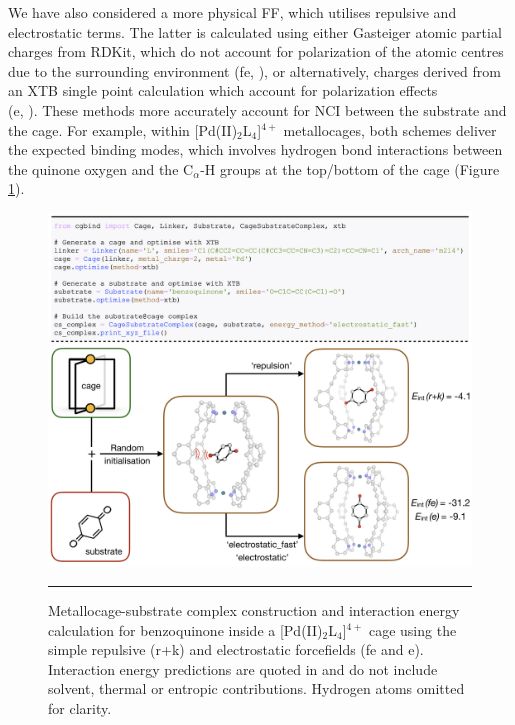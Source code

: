 \documentclass[../../main.tex]{subfiles}
\begin{document}
We have also considered a more physical FF, which utilises repulsive and electrostatic terms. The latter is calculated using either Gasteiger atomic partial charges from RDKit, which do not account for polarization of the atomic centres due to the surrounding environment (fe, ), or alternatively, charges derived from an XTB single point calculation which account for polarization effects \\
(e, ). These methods more accurately account for NCI between the substrate and the cage. For example, within [Pd(II)$_2$L$_4$]$^{4+}$ metallocages, both schemes deliver the expected binding modes, which involves hydrogen bond interactions between the quinone oxygen and the C$_\alpha$-H groups at the top/bottom of the cage (Figure \ref{fig::cg_5}). 


\begin{figure}[h!]
	\vspace{0.4cm}
	\centering
	\includegraphics[width=\textwidth]{3/cgbind/figs/fig5}
	\vspace{0.2cm}
	\hrule
	\caption{Metallocage-substrate complex construction and interaction energy calculation for benzoquinone inside a [Pd(II)$_2$L$_4$]$^{4+}$ cage using the simple repulsive (r+k) and electrostatic forcefields (fe and e). Interaction energy predictions are quoted in \kcalx and do not include solvent, thermal or entropic contributions. Hydrogen atoms omitted for clarity.}
	\label{fig::cg_5}
\end{figure}
\end{document}
